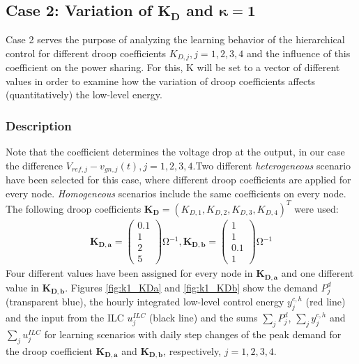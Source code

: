 \subsection{Case 2: Variation of  $\boldsymbol{K_D}$ and $\boldsymbol{\kappa = 1}$}
\label{subsec:case2}
Case 2 serves the purpose of analyzing the learning behavior of the hierarchical control for different droop coefficients $K_{D,j}, j=1,2,3,4$ and the influence of this coefficient on the power sharing. For this, K will be set to a vector of different values in order to examine how the variation of droop coefficients affects (quantitatively) the low-level energy. 
\subsubsection*{Description}
Note that the coefficient determines the voltage drop at the output, in our case the difference $V_{ref,j} - v_{gn,j}(t), j=1,2,3,4$.Two different \textit{heterogeneous} scenario have been selected for this case, where different droop coefficients are applied for every node. \textit{Homogeneous} scenarios include the same coefficients on every node. The following droop coefficients $\boldsymbol{K_D} = (K_{D,1},K_{D,2},K_{D,3},K_{D,4})^T$ were used:
\begin{align*}
\boldsymbol{K_{D,a}} = \left(\begin{array}{c} 0.1 \\ 1 \\2\\5 \end{array}\right)\si{\ohm^{-1}} , \boldsymbol{K_{D,b}} = \left(\begin{array}{c} 1 \\ 1 \\0.1\\1 \end{array}\right)\si{\ohm^{-1}} 
\end{align*}
Four different values have been assigned for every node in $\boldsymbol{K_{D,a}}$ and one different value in $\boldsymbol{K_{D,b}}$.
Figures \ref{fig:k1_KDa} and \ref{fig:k1_KDb} show the demand $P_j^d$ (transparent blue), the hourly integrated low-level control energy $y_j^{c,h}$ (red line) and the input from the ILC $u_j^{ILC}$ (black line) and the sums $\sum_{j}P_j^d$, $\sum_{j}y_j^{c,h}$ and $\sum_{j}u_j^{ILC}$ for learning scenarios with daily step changes of the peak demand for the droop coefficient $\boldsymbol{K_{D,a}}$ and $\boldsymbol{K_{D,b}}$, respectively, $j=1,2,3,4$. 

